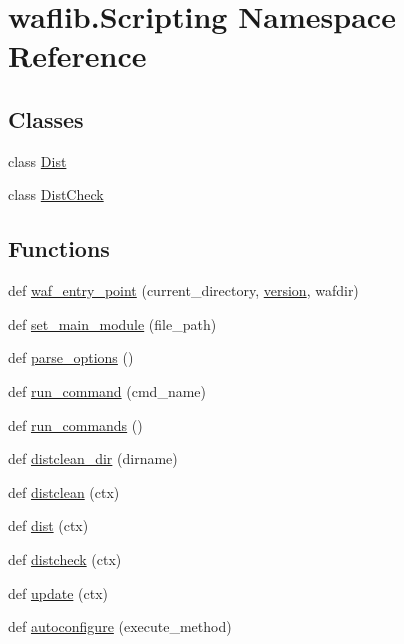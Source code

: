\hypertarget{namespacewaflib_1_1_scripting}{}\section{waflib.\+Scripting Namespace Reference}
\label{namespacewaflib_1_1_scripting}
\subsection*{Classes}
\begin{DoxyCompactItemize}
\item 
class \hyperlink{classwaflib_1_1_scripting_1_1_dist}{Dist}
\item 
class \hyperlink{classwaflib_1_1_scripting_1_1_dist_check}{Dist\+Check}
\end{DoxyCompactItemize}
\subsection*{Functions}
\begin{DoxyCompactItemize}
\item 
def \hyperlink{namespacewaflib_1_1_scripting_af0475248068bf49514936da37a8ad06d}{waf\+\_\+entry\+\_\+point} (current\+\_\+directory, \hyperlink{lib_2expat_8h_aec5db107b91447a96c47961ce9df2660}{version}, wafdir)
\item 
def \hyperlink{namespacewaflib_1_1_scripting_a0b661d623e41224ef81a1117c8e85013}{set\+\_\+main\+\_\+module} (file\+\_\+path)
\item 
def \hyperlink{namespacewaflib_1_1_scripting_a2bda2ff8285115249d46f85770fd9c13}{parse\+\_\+options} ()
\item 
def \hyperlink{namespacewaflib_1_1_scripting_a98e5b0d2647a1b2ed0079113115b31d5}{run\+\_\+command} (cmd\+\_\+name)
\item 
def \hyperlink{namespacewaflib_1_1_scripting_a93d98863de24401f46121efa6efebb25}{run\+\_\+commands} ()
\item 
def \hyperlink{namespacewaflib_1_1_scripting_a27e0c891ab55c641e07172796c3238ad}{distclean\+\_\+dir} (dirname)
\item 
def \hyperlink{namespacewaflib_1_1_scripting_a5fc843a43fb95861d591abfaa7c70444}{distclean} (ctx)
\item 
def \hyperlink{namespacewaflib_1_1_scripting_ade42ef48015fcded2eb15f341967ff47}{dist} (ctx)
\item 
def \hyperlink{namespacewaflib_1_1_scripting_a65ff0b2233e65e673523cde5ff874633}{distcheck} (ctx)
\item 
def \hyperlink{namespacewaflib_1_1_scripting_a001767ca97ff16ec1ad4bc5d8ce817eb}{update} (ctx)
\item 
def \hyperlink{namespacewaflib_1_1_scripting_a3a2a1730248136d38a5c955e91296976}{autoconfigure} (execute\+\_\+method)
\end{DoxyCompactItemize}
